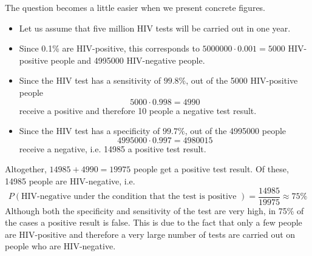 \documentclass[twoside,11pt,a4paper]{article}
\newif\ifEN \ENtrue	                %
\def\tr|#1|#2|{\ifEN #2\else #1\fi}     %
\def\vsp{\vspace{5mm}}
\theoremstyle{definition}
\begin{document}
\tr|Das Problem wird einfacher, wenn wir mit konkreten Zahlen arbeiten. 
|The question becomes a little easier when we present concrete figures. |
\begin{itemize}
\item \tr|Nehmen wir an, dass innnerhalb eines Jahres 5 Millionen
  HIV Test durchgeführt werde.  |Let us assume that five million
  HIV tests will be carried out in one year.|
\item \tr|Da 0.1\% der Bevölkerung HIV-positiv sind ergibt die
  $5000000 \cdot 0.001 = 5000$ HIV-positive Personen and 4995000
  HIV-negative Personen.  |Since 0.1\% are HIV-positive, this
  corresponds to $5000000 \cdot 0.001 = 5000$ HIV-positive people and
  4995000 HIV-negative people.|
\item \tr|Weil der HIV Test eine Sensitivität von $99.8\%$ erhalten
  von diesen 5000 HIV-positiven Personen |Since the HIV test has a
  sensitivity of $99.8\%$, out of the 5000 HIV-positive people|
  \[
    5000\cdot 0.998=4990
  \]
  \tr|einen positiven Test und deshalb 10 Personen einen negativen.
  |receive a positive and therefore 10 people a negative test
  result.|
\item \tr|Da der HIV-Test eine Spezifität von $99.7\%$ hat,
  erhalten von den 4995000 Personen |Since the HIV test has a
  specificity of $99.7\%$, out of the 4995000 people |
  \[
    4995000\cdot 0.997=4980015
  \]
  \tr|einen negativen Test, d.h. 14985 einen positiven.  |receive a
  negative, i.e. 14985 a positive test result.|
\end{itemize}
\tr|Insgesamt erhalten $14985+4990=19975$ Personen eine positiven Test.
Davon sind 14985 Personen HIV-negativ, d.h. 
|Altogether, $14985+4990=19975$ people get a positive test result. 
Of these, 14985 people are HIV-negative, i.e.|
\[
  P(\text{
    \tr|HIV-negativ unter der Bedingung, dass der Test positiv ist
    |HIV-negative under the condition that the test is positive|
  })
  = \frac{14985}{19975}\approx 75\%
\]
\vsp
\tr|Obwohl sowohl Spezifität als auch Sensitivität des Tests seht hoch sind, sind 75\% der positiven
Testresultate falsch.
Der Grund dafür ist, das nur sehr wenige Personen HIV-postiv sind und deshalb wird
eine sehr grosse Anzahl von Tests an HIV-negativen Personen durchgeführt.
|Although both the specificity and sensitivity of the test are very high,
in 75\% of the cases a positive result is false.
This is due to the fact that only a few people are HIV-positive
and therefore a very large number of tests are carried out on people who are HIV-negative.|
\newpage
\end{document}
